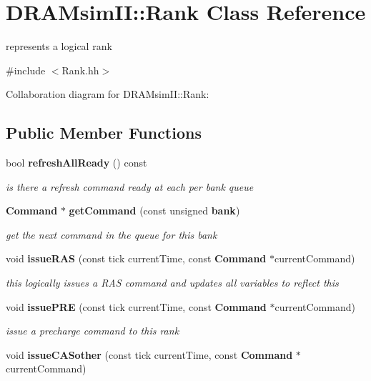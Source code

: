 \section{DRAMsimII::Rank Class Reference}
\label{class_d_r_a_msim_i_i_1_1_rank}


represents a logical rank  




{\ttfamily \#include $<$Rank.hh$>$}



Collaboration diagram for DRAMsimII::Rank:\subsection*{Public Member Functions}
\begin{DoxyCompactItemize}
\item 
bool {\bf refreshAllReady} () const 
\begin{DoxyCompactList}\small\item\em is there a refresh command ready at each per bank queue \item\end{DoxyCompactList}\item 
{\bf Command} $\ast$ {\bf getCommand} (const unsigned {\bf bank})
\begin{DoxyCompactList}\small\item\em get the next command in the queue for this bank \item\end{DoxyCompactList}\item 
void {\bf issueRAS} (const tick currentTime, const {\bf Command} $\ast$currentCommand)\label{class_d_r_a_msim_i_i_1_1_rank_acd302ac19a7481c9dd6cce3af185fada}

\begin{DoxyCompactList}\small\item\em this logically issues a RAS command and updates all variables to reflect this \item\end{DoxyCompactList}\item 
void {\bf issuePRE} (const tick currentTime, const {\bf Command} $\ast$currentCommand)\label{class_d_r_a_msim_i_i_1_1_rank_aaed6f0f5d0a6ee1b65ab7543a60cdf92}

\begin{DoxyCompactList}\small\item\em issue a precharge command to this rank \item\end{DoxyCompactList}\item 
void {\bf issueCASother} (const tick currentTime, const {\bf Command} $\ast$currentCommand)\label{class_d_r_a_msim_i_i_1_1_rank_a666ea94c63822e59cc132968ae290751}


\end{DoxyCompactItemize}
